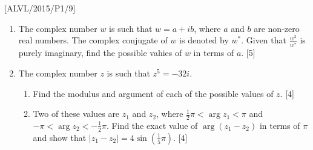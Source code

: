 \item {[}ALVL/2015/P1/9{]}
\begin{enumerate}
\item The complex number $w$ is such that $w=a+ib$, where $a$ and $b$
are non-zero real numbers. The complex conjugate of $w$ is denoted
by $w^{\ast}$. Given that $\frac{w^{2}}{w^{\ast}}$ is purely imaginary,
find the possible vahies of $w$ in terms of $a$.\hfill{} {[}5{]}
\item The complex number $z$ is such that $z^{5}=-32i$.
\begin{enumerate}
\item Find the modulus and argument of each of the possible values of $z$.\hfill{}
{[}4{]}
\item Two of these values are $z_{1}$ and $z_{2}$, where $\frac{1}{2}\pi<\arg z_{1}<\pi$
and $-\pi<\arg z_{2}<-\frac{1}{2}\pi$. Find the exact value of $\arg\left(z_{1}-z_{2}\right)$
in terms of $\pi$ and show that $\left|z_{1}-z_{2}\right|=4\sin\left(\frac{1}{5}\pi\right)$.
\hfill{}{[}4{]}
\end{enumerate}
\end{enumerate}
